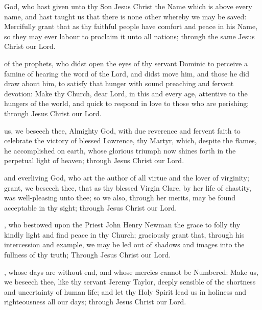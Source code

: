  God, who hast given unto thy Son Jesus Christ the Name which is above every name, and hast taught us that there is none other whereby we may be saved: Mercifully grant that as thy faithful people have comfort and peace in his Name, so they may ever labour to proclaim it unto all nations; through the same Jesus Christ our Lord.

 of the prophets, who didst open the eyes of thy servant Dominic to perceive a famine of hearing the word of the Lord, and didst move him, and those he did draw about him, to satisfy that hunger with sound preaching and fervent devotion: Make thy Church, dear Lord, in this and every age, attentive to the hungers of the world, and quick to respond in love to those who are perishing; through Jesus Christ our Lord.

 us, we beseech thee, Almighty God, with due reverence and fervent faith to celebrate the victory of blessed Lawrence, thy Martyr, which, despite the flames, he accomplished on earth, whose glorious triumph now shines forth in the perpetual light of heaven; through Jesus Christ our Lord.

 and everliving God, who art the author of all virtue and the lover of virginity; grant, we beseech thee, that as thy blessed Virgin Clare, by her life of chastity, was well-pleasing unto thee; so we also, through her merits, may be found acceptable in thy sight; through Jesus Christ our Lord.

, who bestowed upon the Priest John Henry Newman the grace to folly thy kindly light and find peace in thy Church; graciously grant that, through his intercession and example, we may be led out of shadows and images into the fullness of thy truth; Through Jesus Christ our Lord.

, whose days are without end, and whose mercies cannot be Numbered: Make us, we beseech thee, like thy servant Jeremy Taylor, deeply sensible of the shortness and uncertainty of human life; and let thy Holy Spirit lead us in holiness and righteousness all our days; through Jesus Christ our Lord.

